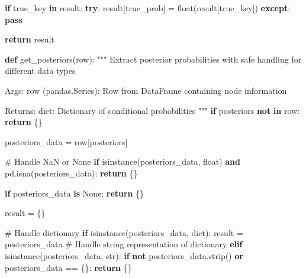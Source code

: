 \documentclass[
  11pt,
  letterpaper,
]{book}
\newenvironment{Shaded}{\begin{snugshade}}{\end{snugshade}}
\newcommand{\BuiltInTok}[1]{\textcolor[rgb]{0.00,0.23,0.31}{#1}}
\newcommand{\CommentTok}[1]{\textcolor[rgb]{0.37,0.37,0.37}{#1}}
\newcommand{\ControlFlowTok}[1]{\textcolor[rgb]{0.00,0.23,0.31}{\textbf{#1}}}
\newcommand{\KeywordTok}[1]{\textcolor[rgb]{0.00,0.23,0.31}{\textbf{#1}}}
\newcommand{\NormalTok}[1]{\textcolor[rgb]{0.00,0.23,0.31}{#1}}
\newcommand{\OperatorTok}[1]{\textcolor[rgb]{0.37,0.37,0.37}{#1}}
\newcommand{\SpecialCharTok}[1]{\textcolor[rgb]{0.37,0.37,0.37}{#1}}
\newcommand{\StringTok}[1]{\textcolor[rgb]{0.13,0.47,0.30}{#1}}
\newcommand{\VariableTok}[1]{\textcolor[rgb]{0.07,0.07,0.07}{#1}}
\begin{document}
\begin{Shaded}
\begin{Highlighting}[]
    \ControlFlowTok{if}\NormalTok{ true\_key }\KeywordTok{in}\NormalTok{ result:}
        \ControlFlowTok{try}\NormalTok{:}
\NormalTok{            result[}\StringTok{\textquotesingle{}true\_prob\textquotesingle{}}\NormalTok{] }\OperatorTok{=} \BuiltInTok{float}\NormalTok{(result[true\_key])}
        \ControlFlowTok{except}\NormalTok{:}
            \ControlFlowTok{pass}

    \ControlFlowTok{return}\NormalTok{ result}

\KeywordTok{def}\NormalTok{ get\_posteriors(row):}
    \CommentTok{"""}
\CommentTok{    Extract posterior probabilities with safe handling for different data types}

\CommentTok{    Args:}
\CommentTok{        row (pandas.Series): Row from DataFrame containing node information}

\CommentTok{    Returns:}
\CommentTok{        dict: Dictionary of conditional probabilities}
\CommentTok{    """}
    \ControlFlowTok{if} \StringTok{\textquotesingle{}posteriors\textquotesingle{}} \KeywordTok{not} \KeywordTok{in}\NormalTok{ row:}
        \ControlFlowTok{return}\NormalTok{ \{\}}

\NormalTok{    posteriors\_data }\OperatorTok{=}\NormalTok{ row[}\StringTok{\textquotesingle{}posteriors\textquotesingle{}}\NormalTok{]}

    \CommentTok{\# Handle NaN or None}
    \ControlFlowTok{if} \BuiltInTok{isinstance}\NormalTok{(posteriors\_data, }\BuiltInTok{float}\NormalTok{) }\KeywordTok{and}\NormalTok{ pd.isna(posteriors\_data):}
        \ControlFlowTok{return}\NormalTok{ \{\}}

    \ControlFlowTok{if}\NormalTok{ posteriors\_data }\KeywordTok{is} \VariableTok{None}\NormalTok{:}
        \ControlFlowTok{return}\NormalTok{ \{\}}

\NormalTok{    result }\OperatorTok{=}\NormalTok{ \{\}}

    \CommentTok{\# Handle dictionary}
    \ControlFlowTok{if} \BuiltInTok{isinstance}\NormalTok{(posteriors\_data, }\BuiltInTok{dict}\NormalTok{):}
\NormalTok{        result }\OperatorTok{=}\NormalTok{ posteriors\_data}
    \CommentTok{\# Handle string representation of dictionary}
    \ControlFlowTok{elif} \BuiltInTok{isinstance}\NormalTok{(posteriors\_data, }\BuiltInTok{str}\NormalTok{):}
        \ControlFlowTok{if} \KeywordTok{not}\NormalTok{ posteriors\_data.strip() }\KeywordTok{or}\NormalTok{ posteriors\_data }\OperatorTok{==} \StringTok{\textquotesingle{}}\SpecialCharTok{\{\}}\StringTok{\textquotesingle{}}\NormalTok{:}
            \ControlFlowTok{return}\NormalTok{ \{\}}


\end{Highlighting}
\end{Shaded}
\end{document}
